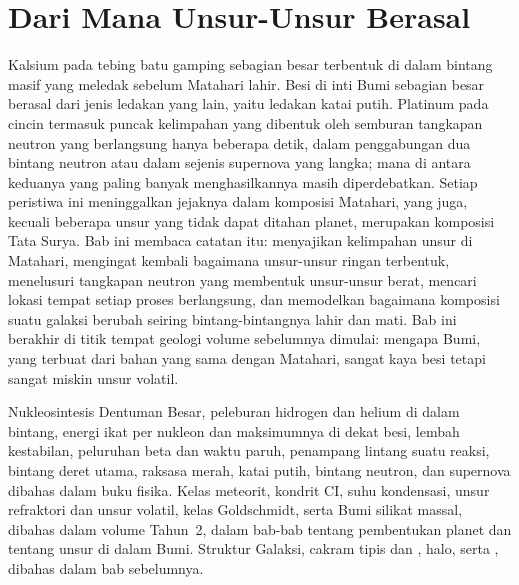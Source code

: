 \chapter{Dari Mana Unsur-Unsur Berasal}\label{ch:b3:origin-of-elements}

Kalsium pada tebing batu gamping sebagian besar terbentuk di dalam
bintang masif yang meledak sebelum Matahari lahir. Besi di
inti Bumi sebagian besar berasal dari jenis ledakan yang lain, yaitu
ledakan katai putih. Platinum pada cincin termasuk puncak kelimpahan yang
dibentuk oleh semburan tangkapan neutron yang berlangsung hanya beberapa detik, dalam
penggabungan dua bintang neutron atau dalam sejenis supernova yang langka; mana di antara keduanya
yang paling banyak menghasilkannya masih diperdebatkan.
Setiap peristiwa ini meninggalkan jejaknya dalam komposisi Matahari,
yang juga, kecuali beberapa unsur yang tidak dapat ditahan planet,
merupakan komposisi Tata Surya. Bab ini membaca catatan itu:
menyajikan kelimpahan unsur di Matahari, mengingat kembali bagaimana unsur-unsur ringan
terbentuk, menelusuri tangkapan neutron yang membentuk unsur-unsur berat, mencari
lokasi tempat setiap proses berlangsung, dan memodelkan bagaimana komposisi suatu
galaksi berubah seiring bintang-bintangnya lahir dan mati. Bab ini berakhir
di titik tempat geologi volume sebelumnya dimulai: mengapa Bumi, yang terbuat dari bahan yang sama dengan
Matahari, sangat kaya besi tetapi sangat miskin unsur volatil.

\begin{recall}
Nukleosintesis Dentuman Besar, peleburan hidrogen dan helium di dalam bintang,
energi ikat per nukleon dan maksimumnya di dekat besi, lembah
kestabilan, peluruhan beta dan waktu paruh, penampang lintang suatu reaksi,
bintang deret utama, raksasa merah, katai putih, bintang neutron, dan
supernova dibahas dalam buku fisika. Kelas meteorit, kondrit CI,
suhu kondensasi, unsur refraktori dan unsur volatil,
kelas Goldschmidt, serta Bumi silikat massal, dibahas dalam
volume Tahun~2, dalam bab-bab tentang pembentukan planet dan tentang
unsur di dalam Bumi. Struktur Galaksi, cakram tipis dan
, halo, serta , dibahas dalam
bab sebelumnya.
\end{recall}

